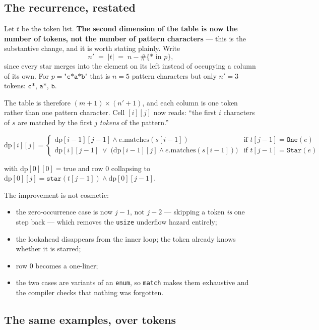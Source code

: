 \documentclass[11pt,a4paper]{article}
\begin{document}
\subsection*{The recurrence, restated}

Let $t$ be the token list. \textbf{The second dimension of the table is now the number of tokens,
not the number of pattern characters} --- this is the substantive change, and it is worth stating
plainly. Write
\[
  n' \;=\; |t| \;=\; n - \#\{\texttt{*} \text{ in } p\},
\]
since every star merges into the element on its left instead of occupying a column of its own. For
$p = \texttt{"c*a*b"}$ that is $n = 5$ pattern characters but only $n' = 3$ tokens:
$\texttt{c*}$, $\texttt{a*}$, $\texttt{b}$.

The table is therefore $(m+1) \times (n'+1)$, and each column is one token rather than one pattern
character. Cell $[i][j]$ now reads: ``the first $i$ characters of $s$ are matched by the first $j$
\emph{tokens} of the pattern.''

\[
  \mathrm{dp}[i][j] =
  \begin{cases}
    \mathrm{dp}[i-1][j-1] \wedge e.\mathrm{matches}(s[i-1])
      & \text{if } t[j-1] = \texttt{One}(e)\\[4pt]
    \mathrm{dp}[i][j-1] \;\vee\;
      \bigl(\mathrm{dp}[i-1][j] \wedge e.\mathrm{matches}(s[i-1])\bigr)
      & \text{if } t[j-1] = \texttt{Star}(e)
  \end{cases}
\]

with $\mathrm{dp}[0][0] = \text{true}$ and row $0$ collapsing to
$\mathrm{dp}[0][j] = \texttt{star}(t[j-1]) \wedge \mathrm{dp}[0][j-1]$.

The improvement is not cosmetic:

\begin{itemize}
  \item the zero-occurrence case is now $j-1$, not $j-2$ --- skipping a token \emph{is} one step
        back --- which removes the \texttt{usize} underflow hazard entirely;
  \item the lookahead disappears from the inner loop; the token already knows whether it is
        starred;
  \item row $0$ becomes a one-liner;
  \item the two cases are variants of an \texttt{enum}, so \texttt{match} makes them exhaustive and
        the compiler checks that nothing was forgotten.
\end{itemize}

\subsection*{The same examples, over tokens}
\end{document}
